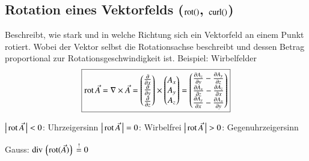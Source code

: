 \subsection[Rotation eines Vektorfelds (rot(), curl())]{Rotation eines Vektorfelds ($\operatorname{rot}()$, $\operatorname{curl}()$)}
Beschreibt, wie stark und in welche Richtung sich ein Vektorfeld an einem Punkt rotiert. Wobei der Vektor selbst die Rotationsachse beschreibt 
und dessen Betrag proportional zur Rotationsgeschwindigkeit ist.
Beispiel: Wirbelfelder
\[
    \boxed{%
        \rot \vec{A}
        = \nabla \times \vec{A}
        =   \begin{pmatrix}
                \frac{\partial}{\partial x}\\
                \frac{\partial}{\partial y}\\
                \frac{\partial}{\partial z}
            \end{pmatrix} \times 
        \begin{pmatrix}
            A_x \\ A_y \\ A_z
        \end{pmatrix} =
        \begin{pmatrix}
            \frac{\partial A_z}{\partial y} - \frac{\partial A_y}{\partial z}\\
            \frac{\partial A_x}{\partial z} - \frac{\partial A_z}{\partial x}\\
            \frac{\partial A_y}{\partial x} - \frac{\partial A_x}{\partial y}
        \end{pmatrix}
    }
\]

\begin{outline}
    \1 $\big|\operatorname{rot} \vec{A}\,\big| < 0$: Uhrzeigersinn
    \1 $\big|\operatorname{rot} \vec{A}\,\big| = 0$: Wirbelfrei
    \1 $\big|\operatorname{rot} \vec{A}\,\big| > 0$: Gegenuhrzeigersinn
\end{outline}

Gauss: $\operatorname{div} \left\lgroup\operatorname{rot}(\vec{A})\right\rgroup \overset{!}{=} 0$ %

